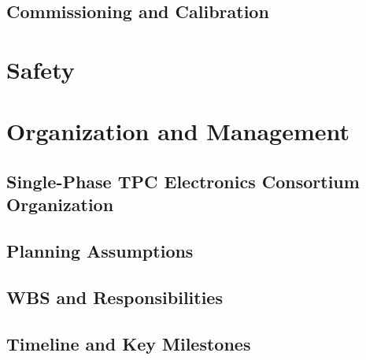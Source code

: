 \subsection{Commissioning and Calibration}
\label{sec:fdsp-tpc-elec-install-calib}



\section{Safety}
\label{sec:fdsp-tpc-elec-safety}



\section{Organization and Management}
\label{sec:fdsp-tpc-elec-org}


\subsection{Single-Phase TPC Electronics Consortium Organization}
\label{sec:fdsp-tpc-elec-org-consort}


\subsection{Planning Assumptions}
\label{sec:fdsp-tpc-elec-org-assmp}


\subsection{WBS and Responsibilities}
\label{sec:fdsp-tpc-elec-org-wbs}


\subsection{Timeline and Key Milestones}
\label{sec:fdsp-tpc-elec-org-timeline}

